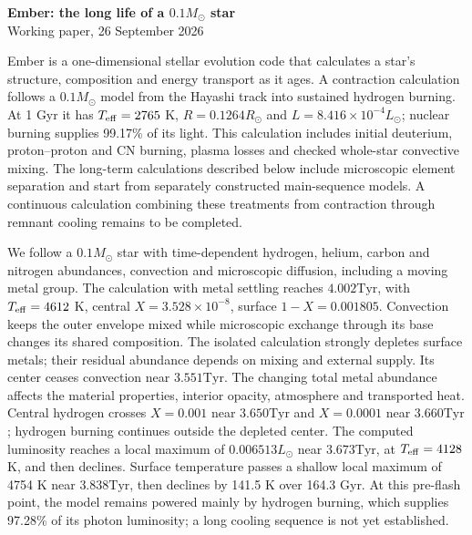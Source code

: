 \documentclass[11pt,letterpaper]{article}
\newcommand{\Ms}{M_\odot}\newcommand{\Rs}{R_\odot}\newcommand{\Ls}{L_\odot}
\newcommand{\Tyr}{\mathrm{Tyr}}
\begin{document}
\begin{center}
{\Large\bfseries Ember: the long life of a $0.1\Ms$ star}\\[8pt]
{\small Working paper, 26 September 2026}
\end{center}

Ember is a one-dimensional stellar evolution code that calculates a star's
structure, composition and energy transport as it ages.
A contraction calculation follows a $0.1\Ms$ model from the Hayashi track
into sustained hydrogen burning. At 1 Gyr it has $T_{\rm eff}=2765$ K,
$R=0.1264\Rs$ and $L=8.416\times10^{-4}\Ls$; nuclear burning supplies
99.17\% of its light. This calculation includes initial deuterium,
proton--proton and CN burning, plasma losses and checked whole-star
convective mixing. The long-term calculations described below include
microscopic element separation and start from separately constructed
main-sequence models. A continuous calculation combining these treatments
from contraction through remnant cooling remains to be completed.

We follow a $0.1\Ms$ star with time-dependent hydrogen, helium, carbon and
nitrogen abundances, convection and microscopic diffusion, including a moving
metal group. The calculation with metal settling reaches $4.002\Tyr$,
with $T_{\rm eff}=4612$ K, central $X=3.528\times10^{-8}$,
surface $1-X=0.001805$. Convection keeps the outer envelope mixed while
microscopic exchange through its base changes its shared composition.
The isolated calculation strongly depletes surface metals; their residual
abundance depends on mixing and external supply.
Its center ceases convection near $3.551\Tyr$. The changing total metal abundance affects the material
properties, interior opacity, atmosphere and transported heat. Central hydrogen crosses $X=0.001$
near $3.650\Tyr$ and $X=0.0001$ near $3.660\Tyr$; hydrogen burning
continues outside the depleted center. The computed luminosity reaches a
local maximum of $0.006513\Ls$ near $3.673\Tyr$, at $T_{\rm eff}=4128$ K,
and then declines. Surface temperature passes a shallow local maximum of 4754 K
near $3.838\Tyr$, then declines by 141.5 K
over 164.3 Gyr. At this pre-flash point, the model remains powered mainly by
hydrogen burning, which supplies 97.28\% of its photon luminosity; a long cooling sequence is not yet established.
\end{document}
